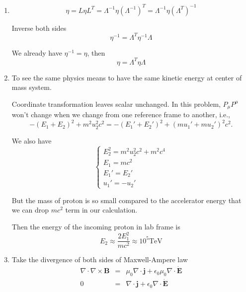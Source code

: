 \documentclass[12pt,a4paper]{article}
\begin{document}
\begin{enumerate}
\item
\begin{equation}
	\eta = L\eta L^T = \Lambda^{-1} \eta(\Lambda^{-1})^T = \Lambda^{-1} \eta(\Lambda^{T})^{-1}
\end{equation}

Inverse both sides
\begin{equation}
	\eta^{-1} = \Lambda^T \eta^{-1} \Lambda
\end{equation}

We already have $\eta^{-1} = \eta$, then
\begin{equation}
	\eta = \Lambda^T \eta \Lambda
\end{equation}



\item
To see the same physics means to have the same kinetic energy at center of mass system.

Coordinate transformation leaves scalar unchanged. In this problem, $P_\mu P^\mu$ won't change when we change from one reference frame to another, i.e.,
\begin{equation*}
	-(E_1 + E_2)^2 + m^2 u_2^2c^2 = -(E_1' + E_2')^2 + (m u_1' + m u_2')^2c^2 .
\end{equation*}

We also have
\begin{equation}
	\begin{cases}
	E_2^2=m^2 u_2^2 c^2 + m^2 c^4 \\
	E_1=mc^2 \\
	E_1'=E_2'\\
	u_1'=-u_2'
	\end{cases}
\end{equation}

But the mass of proton is so small compared to the accelerator energy that we can drop $mc^2$ term in our calculation.

Then the energy of the incoming proton in lab frame is
\begin{equation}
	E_2 \approx \frac{2 E_1^2}{mc^2} \approx 10^5 \text{TeV}
\end{equation}




\item

Take the divergence of both sides of Maxwell-Ampere law
\begin{eqnarray*}
	\nabla \cdot \nabla \times \bm B &=& \mu_0 \nabla\cdot\bm j + \epsilon_0 \mu_0 \nabla\cdot\dot{\bm E} \\
	0 &=& \nabla\cdot \bm j + \epsilon_0\nabla\cdot \dot{\bm E}
\end{eqnarray*}


\end{enumerate}
\end{document}
